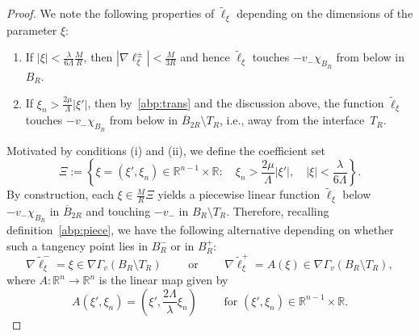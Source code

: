 \documentclass[letter,11pt]{amsart}
\newcommand{\R}{\mathbb{R}}
\newcommand{\chara}[1]{\chi_{#1}}
\theoremstyle{definition}
\numberwithin{equation}{section}
\begin{document}
\begin{proof}
\medskip

We note the following properties of $\widetilde{\ell}_{\xi}$ depending on the dimensions of the parameter $\xi$:
\begin{enumerate}[label=(\roman*)]
\item If $|\xi| < \frac{\lambda}{6 \Lambda} \frac{M}{R}$, then $|\nabla \ell_{\xi}^{\pm}| < \frac{M}{3R}$ and hence $\widetilde{\ell}_{\xi}$ touches $-v_{-} \chara{B_R}$ from below in $B_R$.
\item If $\xi_n > \frac{2 \mu}{\Lambda} |\xi'|$, then by~\eqref{abp:trans} and the discussion above, the function $\widetilde{\ell}_{\xi}$ touches $-v_{-}\chara{B_R}$ from below in $\overline{B}_{2R} \setminus T_R$, i.e., away from the interface~$T_R$.
\end{enumerate}
Motivated by conditions (i) and (ii), we define the coefficient set 
\[
\Xi := \left\{\xi = (\xi', \xi_n) \in \R^{n-1}\times \R \colon \quad  \xi_n > \frac{2\mu}{\Lambda} |\xi'|, \quad |\xi| < \frac{\lambda}{6 \Lambda}\right\}.
\]
By construction, each $\xi \in \frac{M}{R}\Xi$ yields a piecewise linear function $\widetilde{\ell}_{\xi}$ below $- v_{-} \chara{B_R}$ in $\overline{B}_{2R}$ and touching $-v_{-}$ in $B_R\setminus T_R$.
Therefore, recalling definition~\eqref{abp:piece}, we have the following alternative depending on whether such a tangency point lies in $B_R^{-}$ or in $B_R^{+}$:
\[
\nabla \widetilde{\ell}^{-}_{\xi} = \xi 
\in \nabla \Gamma_{v}(B_R \setminus T_R)
\qquad \text{ or } \qquad 
\nabla \widetilde{\ell}^{+}_{\xi} = A (\xi) \in \nabla \Gamma_{v}(B_R \setminus T_R),
\]
where $A \colon \R^{n} \to \R^{n}$ is the linear map given by
\[
A(\xi', \xi_n) = (\xi', \textstyle\frac{2\Lambda}{\lambda} \xi_n) \qquad \text{ for } (\xi', \xi_n) \in \R^{n-1} \times \R.
\]

\medskip


\end{proof}
\end{document}
